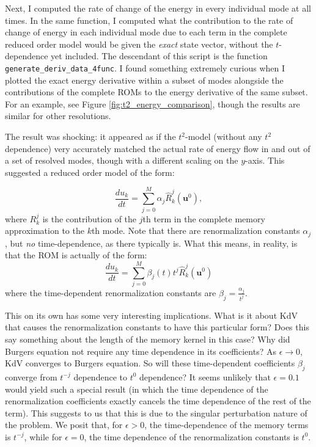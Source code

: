 \documentclass{article}
\begin{document}
Next, I computed the rate of change of the energy in every individual mode at all times. In the same function, I computed what the contribution to the rate of change of energy in each individual mode due to each term in the complete reduced order model would be given the \emph{exact} state vector, without the $t$-dependence yet included. The descendant of this script is the function \verb!generate_deriv_data_4func!. I found something extremely curious when I plotted the exact energy derivative within a subset of modes alongside the contributions of the complete ROMs to the energy derivative of the same subset. For an example, see Figure \ref{fig:t2_energy_comparison}, though the results are similar for other resolutions.



The result was shocking: it appeared as if the $t^2$-model (without any $t^2$ dependence) very accurately matched the actual rate of energy flow in and out of a set of resolved modes, though with a different scaling on the $y$-axis. This suggested a reduced order model of the form:

\begin{equation}\frac{du_k}{dt} = \sum_{j=0}^M \alpha_j\hat{R}_k^j(\mathbf{u}^0),\label{eq:no_t}
\end{equation}where $R_k^j$ is the contribution of the $j$th term in the complete memory approximation to the $k$th mode. Note that there are renormalization constants $\alpha_j$, but \emph{no} time-dependence, as there typically is. What this means, in reality, is that the ROM is actually of the form:
\[\frac{du_k}{dt} = \sum_{j=0}^M \beta_j(t)t^j\hat{R}_k^j(\mathbf{u}^0)
\]where the time-dependent renormalization constants are $\beta_j = \frac{\alpha_j}{t^j}$.

This on its own has some very interesting implications. What is it about KdV that causes the renormalization constants to have this particular form? Does this say something about the length of the memory kernel in this case? Why did Burgers equation not require any time dependence in its coefficients? As $\epsilon\to0$, KdV converges to Burgers equation. So will these time-dependent coefficients $\beta_j$ converge from $t^{-j}$ dependence to $t^0$ dependence? It seems unlikely that $\epsilon=0.1$ would yield such a special result (in which the time dependence of the renormalization coefficients exactly cancels the time dependence of the rest of the term). This suggests to us that this is due to the singular perturbation nature of the problem. We posit that, for $\epsilon>0$, the time-dependence of the memory terms is $t^{-j}$, while for $\epsilon=0$, the time dependence of the renormalization constants is $t^0$.
\end{document}
